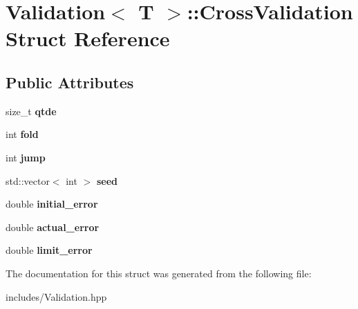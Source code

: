 \hypertarget{struct_validation_1_1_cross_validation}{}\section{Validation$<$ T $>$\+:\+:Cross\+Validation Struct Reference}
\label{struct_validation_1_1_cross_validation}
\subsection*{Public Attributes}
\begin{DoxyCompactItemize}
\item 
\mbox{\label{struct_validation_1_1_cross_validation_a1390b0775383e95347b9d502376b028a}} 
size\+\_\+t {\bfseries qtde}
\item 
\mbox{\label{struct_validation_1_1_cross_validation_a24522e62bed86b222427793059358453}} 
int {\bfseries fold}
\item 
\mbox{\label{struct_validation_1_1_cross_validation_aaa216ea500fc18c08d5b2b6ecfa2d6b5}} 
int {\bfseries jump}
\item 
\mbox{\label{struct_validation_1_1_cross_validation_a759a6c1c6ebce11575401fb0cc397e06}} 
std\+::vector$<$ int $>$ {\bfseries seed}
\item 
\mbox{\label{struct_validation_1_1_cross_validation_acdccfcf784001cd120096263fe27e03d}} 
double {\bfseries initial\+\_\+error}
\item 
\mbox{\label{struct_validation_1_1_cross_validation_a58b86e73f6085890ec4cf4b755bb5ab0}} 
double {\bfseries actual\+\_\+error}
\item 
\mbox{\label{struct_validation_1_1_cross_validation_af6298877a122a8e4bcd447277476677b}} 
double {\bfseries limit\+\_\+error}
\end{DoxyCompactItemize}


The documentation for this struct was generated from the following file\+:\begin{DoxyCompactItemize}
\item 
includes/Validation.\+hpp\end{DoxyCompactItemize}
